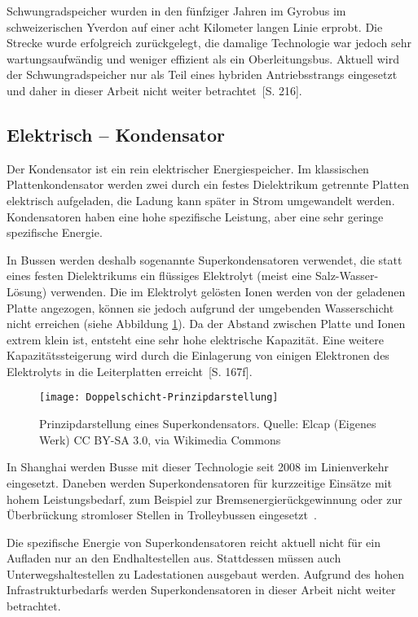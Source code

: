 Schwungradspeicher wurden in den fünfziger Jahren im Gyrobus im schweizerischen Yverdon auf einer acht Kilometer langen Linie erprobt. Die Strecke wurde erfolgreich zurückgelegt, die damalige Technologie war jedoch sehr wartungsaufwändig und weniger effizient als ein Oberleitungsbus. Aktuell wird der Schwungradspeicher nur als Teil eines hybriden Antriebsstrangs eingesetzt und daher in dieser Arbeit nicht weiter betrachtet~\cite{tub_aleph001746639}[S. 216].

\subsection{Elektrisch – Kondensator}
Der Kondensator ist ein rein elektrischer Energiespeicher. Im klassischen Plattenkondensator werden zwei durch ein festes Dielektrikum getrennte Platten elektrisch aufgeladen, die Ladung kann später in Strom umgewandelt werden. Kondensatoren haben eine hohe spezifische Leistung, aber eine sehr geringe spezifische Energie.

In Bussen werden deshalb sogenannte Superkondensatoren verwendet, die statt eines festen Dielektrikums ein flüssiges Elektrolyt (meist eine Salz-Wasser-Lösung) verwenden. Die im Elektrolyt gelösten Ionen werden von der geladenen Platte angezogen, können sie jedoch aufgrund der umgebenden Wasserschicht nicht erreichen (siehe Abbildung \ref{abb_doppelschicht}). Da der Abstand zwischen Platte und Ionen extrem klein ist, entsteht eine sehr hohe elektrische Kapazität. Eine weitere Kapazitätssteigerung wird durch die Einlagerung von einigen Elektronen des Elektrolyts in die Leiterplatten erreicht~\cite{Sterner:2014}[S. 167f].

\begin{figure}\centering
	\texttt{[image: Doppelschicht-Prinzipdarstellung]}
	\caption[Prinzipdarstellung eines Superkondensators]{Prinzipdarstellung eines Superkondensators. Quelle: Elcap (Eigenes Werk) CC BY-SA 3.0, via Wikimedia Commons}
	\label{abb_doppelschicht}
\end{figure}

In Shanghai werden Busse mit dieser Technologie seit 2008 im Linienverkehr eingesetzt. Daneben werden Superkondensatoren für kurzzeitige Einsätze mit hohem Leistungsbedarf, zum Beispiel zur Bremsenergierückgewinnung oder zur Überbrückung stromloser Stellen in Trolleybussen eingesetzt~\cite{Barminer-Busgesellschaft:2012}.

Die spezifische Energie von Superkondensatoren reicht aktuell nicht für ein Aufladen nur an den Endhaltestellen aus. Stattdessen müssen auch Unterwegshaltestellen zu Ladestationen ausgebaut werden. Aufgrund des hohen Infrastrukturbedarfs werden Superkondensatoren in dieser Arbeit nicht weiter betrachtet.

